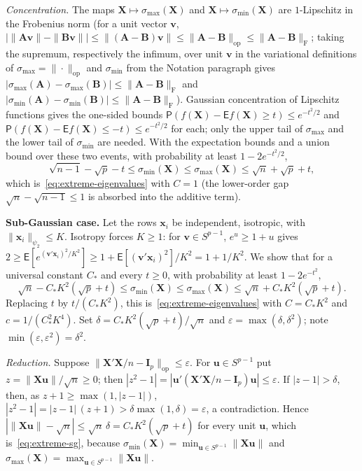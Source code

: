 \documentclass[12pt,a4paper]{article}
\makeatletter
\theoremstyle{definition}
\renewenvironment{proof}[1][\proofname]{\par
  \pushQED{\qed}%
  \normalfont \topsep6\p@\@plus6\p@\relax
  \trivlist
  \item[\hskip\labelsep\bfseries #1\@addpunct{.}]\ignorespaces
}{%
  \popQED\endtrivlist\@endpefalse
}
\newcommand\expc{\mathsf{E}}
\newcommand\prb{\mathsf{P}}
\newcommand{\bX}{\mathbf{X}}
\newcommand{\bx}{\mathbf{x}}
\newcommand{\bI}{\mathbf{I}}
\newcommand{\bA}{\mathbf{A}}
\newcommand{\bB}{\mathbf{B}}
\newcommand{\bv}{\mathbf{v}}
\newcommand{\bu}{\mathbf{u}}
\newcommand{\opnorm}[1]{\|#1\|_{\mathrm{op}}}
\newcommand{\fnorm}[1]{\|#1\|_{\mathrm{F}}}
\makeatother
\begin{document}
\begin{proof}
\emph{Concentration.} The maps $\bX \mapsto \sigma_{\max}(\bX)$ and $\bX \mapsto \sigma_{\min}(\bX)$ are $1$-Lipschitz in the Frobenius norm (for a unit vector $\bv$, $\bigl|\|\bA\bv\| - \|\bB\bv\|\bigr| \leqslant \|(\bA - \bB)\bv\| \leqslant \opnorm{\bA - \bB} \leqslant \fnorm{\bA - \bB}$; taking the supremum, respectively the infimum, over unit $\bv$ in the variational definitions of $\sigma_{\max} = \opnorm{\cdot}$ and $\sigma_{\min}$ from the Notation paragraph gives $|\sigma_{\max}(\bA) - \sigma_{\max}(\bB)| \leqslant \fnorm{\bA - \bB}$ and $|\sigma_{\min}(\bA) - \sigma_{\min}(\bB)| \leqslant \fnorm{\bA - \bB}$). Gaussian concentration of Lipschitz functions gives the one-sided bounds $\prb(f(\bX) - \expc f(\bX) \geqslant t) \leqslant e^{-t^2/2}$ and $\prb(f(\bX) - \expc f(\bX) \leqslant -t) \leqslant e^{-t^2/2}$ for each; only the upper tail of $\sigma_{\max}$ and the lower tail of $\sigma_{\min}$ are needed. With the expectation bounds and a union bound over these two events, with probability at least $1 - 2e^{-t^2/2}$,
\[
\sqrt{n-1} - \sqrt{p} - t \leqslant \sigma_{\min}(\bX) \leqslant \sigma_{\max}(\bX) \leqslant \sqrt{n} + \sqrt{p} + t,
\]
which is~\eqref{eq:extreme-eigenvalues} with $C = 1$ (the lower-order gap $\sqrt{n}-\sqrt{n-1} \leqslant 1$ is absorbed into the additive term).

\medskip\noindent\textbf{Sub-Gaussian case.} Let the rows $\bx_i$ be independent, isotropic, with $\|\bx_i\|_{\psi_2} \leqslant K$. Isotropy forces $K \geqslant 1$: for $\bv \in S^{p-1}$, $e^u \geqslant 1 + u$ gives $2 \geqslant \expc[e^{(\bv'\bx_i)^2/K^2}] \geqslant 1 + \expc[(\bv'\bx_i)^2]/K^2 = 1 + 1/K^2$. We show that for a universal constant $C_*$ and every $t \geqslant 0$, with probability at least $1 - 2e^{-t^2}$,
\begin{equation}\label{eq:extreme-sg}
\sqrt{n} - C_*K^2(\sqrt{p} + t) \leqslant \sigma_{\min}(\bX) \leqslant \sigma_{\max}(\bX) \leqslant \sqrt{n} + C_*K^2(\sqrt{p} + t).
\end{equation}
Replacing $t$ by $t/(C_*K^2)$, this is~\eqref{eq:extreme-eigenvalues} with $C = C_*K^2$ and $c = 1/(C_*^2K^4)$. Set $\delta = C_*K^2(\sqrt{p} + t)/\sqrt{n}$ and $\varepsilon = \max(\delta, \delta^2)$; note $\min(\varepsilon, \varepsilon^2) = \delta^2$.

\emph{Reduction.} Suppose $\opnorm{\bX'\bX/n - \bI_p} \leqslant \varepsilon$. For $\bu \in S^{p-1}$ put $z = \|\bX\bu\|/\sqrt{n} \geqslant 0$; then $|z^2 - 1| = |\bu'(\bX'\bX/n - \bI_p)\bu| \leqslant \varepsilon$. If $|z - 1| > \delta$, then, as $z + 1 \geqslant \max(1, |z - 1|)$, $|z^2 - 1| = |z-1|\,(z+1) > \delta\max(1, \delta) = \varepsilon$, a contradiction. Hence $|\|\bX\bu\| - \sqrt{n}| \leqslant \sqrt{n}\,\delta = C_*K^2(\sqrt{p} + t)$ for every unit $\bu$, which is~\eqref{eq:extreme-sg}, because $\sigma_{\min}(\bX) = \min_{\bu \in S^{p-1}}\|\bX\bu\|$ and $\sigma_{\max}(\bX) = \max_{\bu \in S^{p-1}}\|\bX\bu\|$.


\end{proof}
\end{document}
